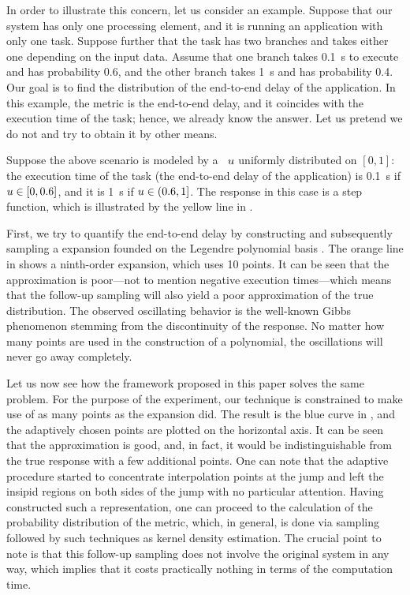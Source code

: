 In order to illustrate this concern, let us consider an example. Suppose that
our system has only one processing element, and it is running an application
with only one task. Suppose further that the task has two branches and takes
either one depending on the input data. Assume that one branch takes 0.1~s to
execute and has probability 0.6, and the other branch takes 1~s and has
probability 0.4. Our goal is to find the distribution of the end-to-end delay of
the application. In this example, the metric is the end-to-end delay, and it
coincides with the execution time of the task; hence, we already know the
answer. Let us pretend we do not and try to obtain it by other means.

Suppose the above scenario is modeled by a \rv\ $u$ uniformly distributed on
$[0, 1]$: the execution time of the task (the end-to-end delay of the
application) is 0.1~s if $u \in [0, 0.6]$, and it is 1~s if $u \in (0.6, 1]$.
The response in this case is a step function, which is illustrated by the yellow
line in .

First, we try to quantify the end-to-end delay by constructing and subsequently
sampling a  expansion founded on the Legendre polynomial basis
\cite{xiu2010}. The orange line in  shows a ninth-order 
expansion, which uses 10 points. It can be seen that the approximation is
poor---not to mention negative execution times---which means that the follow-up
sampling will also yield a poor approximation of the true distribution. The
observed oscillating behavior is the well-known Gibbs phenomenon stemming from
the discontinuity of the response. No matter how many points are used in the
construction of a polynomial, the oscillations will never go away completely.

Let us now see how the framework proposed in this paper solves the same problem.
For the purpose of the experiment, our technique is constrained to make use of
as many points as the  expansion did. The result is the blue curve in
, and the adaptively chosen points are plotted on the
horizontal axis. It can be seen that the approximation is good, and, in fact, it
would be indistinguishable from the true response with a few additional points.
One can note that the adaptive procedure started to concentrate interpolation
points at the jump and left the insipid regions on both sides of the jump with
no particular attention. Having constructed such a representation, one can
proceed to the calculation of the probability distribution of the metric, which,
in general, is done via sampling followed by such techniques as kernel density
estimation. The crucial point to note is that this follow-up sampling does not
involve the original system in any way, which implies that it costs practically
nothing in terms of the computation time.

